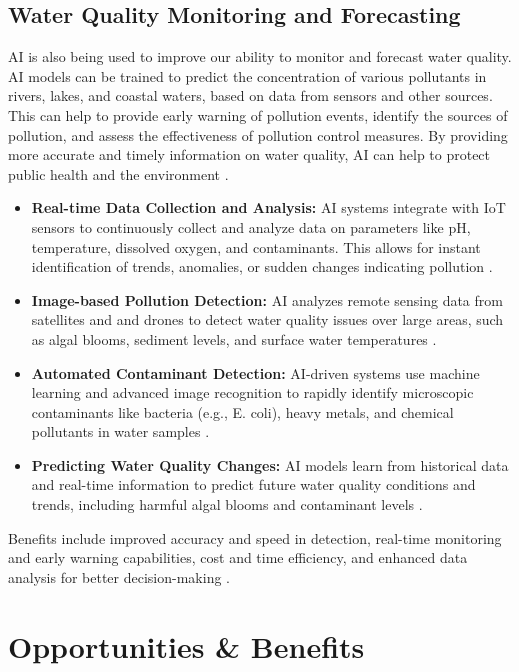 \subsection{Water Quality Monitoring and Forecasting}
AI is also being used to improve our ability to monitor and forecast water quality. AI models can be trained to predict the concentration of various pollutants in rivers, lakes, and coastal waters, based on data from sensors and other sources. This can help to provide early warning of pollution events, identify the sources of pollution, and assess the effectiveness of pollution control measures. By providing more accurate and timely information on water quality, AI can help to protect public health and the environment \cite{goyal2020review}.
\begin{itemize}
    \item \textbf{Real-time Data Collection and Analysis:} AI systems integrate with IoT sensors to continuously collect and analyze data on parameters like pH, temperature, dissolved oxygen, and contaminants. This allows for instant identification of trends, anomalies, or sudden changes indicating pollution \cite{MDPI_WaterQuality, WaterAndWastewater_WaterQuality}.
    \item \textbf{Image-based Pollution Detection:} AI analyzes remote sensing data from satellites and and drones to detect water quality issues over large areas, such as algal blooms, sediment levels, and surface water temperatures \cite{FrontiersIn_WaterQuality, Sajdi_WaterQuality}.
    \item \textbf{Automated Contaminant Detection:} AI-driven systems use machine learning and advanced image recognition to rapidly identify microscopic contaminants like bacteria (e.g., E. coli), heavy metals, and chemical pollutants in water samples \cite{SBNSoftware_WaterQuality}.
    \item \textbf{Predicting Water Quality Changes:} AI models learn from historical data and real-time information to predict future water quality conditions and trends, including harmful algal blooms and contaminant levels \cite{ScienceDaily_WaterQuality, IWAPOnline_WaterQuality}.
\end{itemize}
Benefits include improved accuracy and speed in detection, real-time monitoring and early warning capabilities, cost and time efficiency, and enhanced data analysis for better decision-making \cite{AZOAI_WaterQuality, ELearnCollege_WaterQuality}.

\section{Opportunities \& Benefits}

